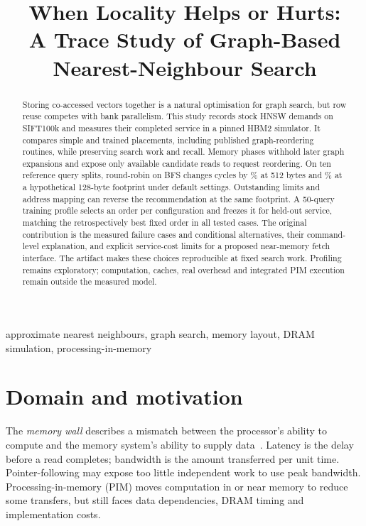 \documentclass[conference]{IEEEtran}
\begin{document}
\title{When Locality Helps or Hurts:\\A Trace Study of Graph-Based Nearest-Neighbour Search}
\author{}
\maketitle
\begin{abstract}
Storing co-accessed vectors together is a natural optimisation for graph search, but row reuse competes with bank parallelism. This study records stock HNSW demands on SIFT100k and measures their completed service in a pinned HBM2 simulator. It compares simple and trained placements, including published graph-reordering routines, while preserving search work and recall. Memory phases withhold later graph expansions and expose only available candidate reads to request reordering. On ten reference query splits, round-robin on BFS changes cycles by \RoundRobinBFSMeanFloat\% at 512 bytes and \RoundRobinBFSMeanCompact\% at a hypothetical 128-byte footprint under default settings. Outstanding limits and address mapping can reverse the recommendation at the same footprint. A 50-query training profile selects an order per configuration and freezes it for held-out service, matching the retrospectively best fixed order in all \ProfileOracleMatches{} tested cases. The original contribution is the measured failure cases and conditional alternatives, their command-level explanation, and explicit service-cost limits for a proposed near-memory fetch interface. The artifact makes these choices reproducible at fixed search work. Profiling remains exploratory; computation, caches, real overhead and integrated PIM execution remain outside the measured model.
\end{abstract}
\begin{IEEEkeywords}approximate nearest neighbours, graph search, memory layout, DRAM simulation, processing-in-memory\end{IEEEkeywords}

\section{Domain and motivation}
The \emph{memory wall} describes a mismatch between the processor's ability to compute and the memory system's ability to supply data~\cite{primer}. Latency is the delay before a read completes; bandwidth is the amount transferred per unit time. Pointer-following may expose too little independent work to use peak bandwidth. Processing-in-memory (PIM) moves computation in or near memory to reduce some transfers, but still faces data dependencies, DRAM timing and implementation costs.
\end{document}
